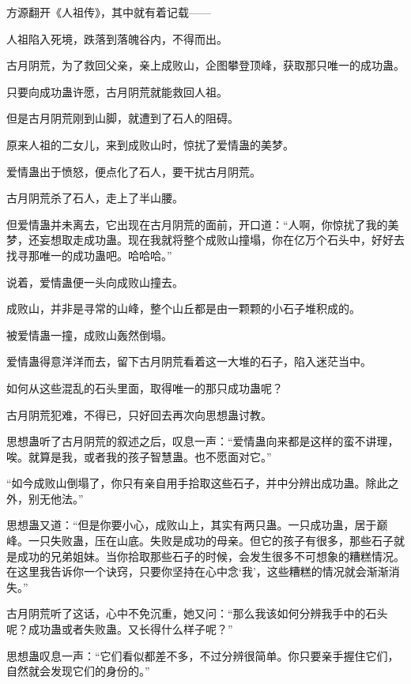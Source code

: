 
\begin{this_body}

方源翻开《人祖传》，其中就有着记载——

人祖陷入死境，跌落到落魄谷内，不得而出。

古月阴荒，为了救回父亲，亲上成败山，企图攀登顶峰，获取那只唯一的成功蛊。

只要向成功蛊许愿，古月阴荒就能救回人祖。

但是古月阴荒刚到山脚，就遭到了石人的阻碍。

原来人祖的二女儿，来到成败山时，惊扰了爱情蛊的美梦。

爱情蛊出于愤怒，便点化了石人，要干扰古月阴荒。

古月阴荒杀了石人，走上了半山腰。

但爱情蛊并未离去，它出现在古月阴荒的面前，开口道：“人啊，你惊扰了我的美梦，还妄想取走成功蛊。现在我就将整个成败山撞塌，你在亿万个石头中，好好去找寻那唯一的成功蛊吧。哈哈哈。”

说着，爱情蛊便一头向成败山撞去。

成败山，并非是寻常的山峰，整个山丘都是由一颗颗的小石子堆积成的。

被爱情蛊一撞，成败山轰然倒塌。

爱情蛊得意洋洋而去，留下古月阴荒看着这一大堆的石子，陷入迷茫当中。

如何从这些混乱的石头里面，取得唯一的那只成功蛊呢？

古月阴荒犯难，不得已，只好回去再次向思想蛊讨教。

思想蛊听了古月阴荒的叙述之后，叹息一声：“爱情蛊向来都是这样的蛮不讲理，唉。就算是我，或者我的孩子智慧蛊。也不愿面对它。”

“如今成败山倒塌了，你只有亲自用手拾取这些石子，并中分辨出成功蛊。除此之外，别无他法。”

思想蛊又道：“但是你要小心，成败山上，其实有两只蛊。一只成功蛊，居于巅峰。一只失败蛊，压在山底。失败是成功的母亲。但它的孩子有很多，那些石子就是成功的兄弟姐妹。当你拾取那些石子的时候，会发生很多不可想象的糟糕情况。在这里我告诉你一个诀窍，只要你坚持在心中念‘我’，这些糟糕的情况就会渐渐消失。”

古月阴荒听了这话，心中不免沉重，她又问：“那么我该如何分辨我手中的石头呢？成功蛊或者失败蛊。又长得什么样子呢？”

思想蛊叹息一声：“它们看似都差不多，不过分辨很简单。你只要亲手握住它们，自然就会发现它们的身份的。”


\end{this_body}
